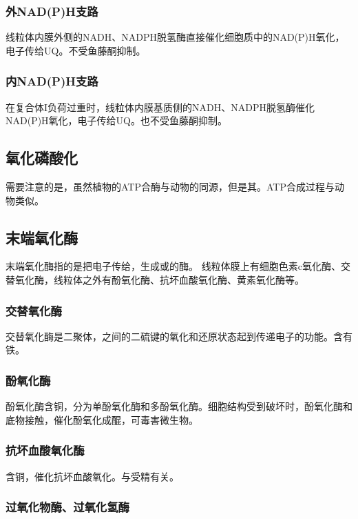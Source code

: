 \subsubsection{外NAD(P)H支路}

线粒体内膜外侧的NADH、NADPH脱氢酶直接催化细胞质中的NAD(P)H氧化，电子传给UQ。不受鱼藤酮抑制。

\subsubsection{内NAD(P)H支路}

在复合体I负荷过重时，线粒体内膜基质侧的NADH、NADPH脱氢酶催化NAD(P)H氧化，电子传给UQ。也不受鱼藤酮抑制。

\subsection{氧化磷酸化}

需要注意的是，虽然植物的ATP合酶与动物的同源，但是其。ATP合成过程与动物类似。

\subsection{末端氧化酶}

末端氧化酶指的是把电子传给，生成或的酶。
线粒体膜上有细胞色素c氧化酶、交替氧化酶，线粒体之外有酚氧化酶、抗坏血酸氧化酶、黄素氧化酶等。

\subsubsection{交替氧化酶}

交替氧化酶是二聚体，之间的二硫键的氧化和还原状态起到传递电子的功能。含有铁。

\subsubsection{酚氧化酶}

酚氧化酶含铜，分为单酚氧化酶和多酚氧化酶。细胞结构受到破坏时，酚氧化酶和底物接触，催化酚氧化成醌，可毒害微生物。

\subsubsection{抗坏血酸氧化酶}

含铜，催化抗坏血酸氧化。与受精有关。

\subsubsection{过氧化物酶、过氧化氢酶}


